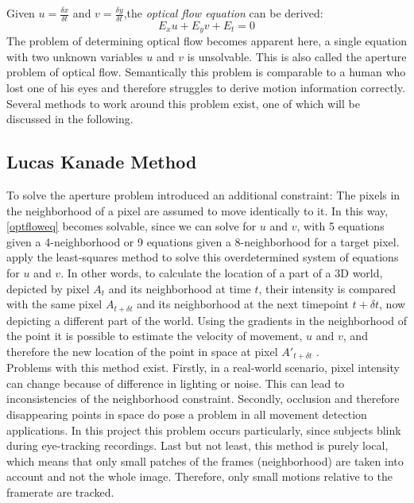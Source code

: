 \documentclass[Bachelorarbeit.tex]{subfiles}
\begin{document}
Given $u = \frac{\delta x}{\delta t}$ and $v = \frac{\delta y}{\delta t}$,the \textit{optical flow equation} can be derived:
\begin{equation}
\label{optfloweq}
E_x u + E_y v + E_t = 0
\end{equation}
The problem of determining optical flow becomes apparent here, a single equation with two unknown variables $u$ and $v$ is unsolvable. This is also called the aperture problem of optical flow. Semantically this problem is comparable to a human who lost one of his eyes and therefore struggles to derive motion information correctly. Several methods to work around this problem exist, one of which will be discussed in the following.

\subsection{Lucas Kanade Method}
\label{lk}
To solve the aperture problem \cite{lucas1981iterative} introduced an additional constraint: The pixels in the neighborhood of a pixel are assumed to move identically to it. In this way, \autoref{optfloweq} becomes solvable, since we can solve for $u$ and $v$, with 5 equations given a 4-neighborhood or 9 equations given a 8-neighborhood for a target pixel. \cite{lucas1981iterative} apply the least-squares method to solve this overdetermined system of equations for $u$ and $v$. 
In other words, to calculate the location of a part of a 3D world, depicted by pixel $A_t$ and its neighborhood at time $t$, their intensity is compared with the same pixel $A_{t+\delta t}$ and its neighborhood at the next timepoint $t+\delta t$, now depicting a different part of the world. Using the gradients in the neighborhood of the point it is possible to estimate the velocity of movement, $u$ and $v$, and therefore the new location of the point in space at pixel $A'_{t+\delta t}$ \citep{rojas2010lucas}. \\
Problems with this method exist. Firstly, in a real-world scenario, pixel intensity can change because of difference in lighting or noise. This can lead to inconsistencies of the neighborhood constraint. Secondly, occlusion and therefore disappearing points in space do pose a problem in all movement detection applications. In this project this problem occurs particularly, since subjects blink during eye-tracking recordings. Last but not least, this method is purely local, which means that only small patches of the frames (neighborhood) are taken into account and not the whole image. Therefore, only small motions relative to the framerate are tracked. \\
\end{document}
